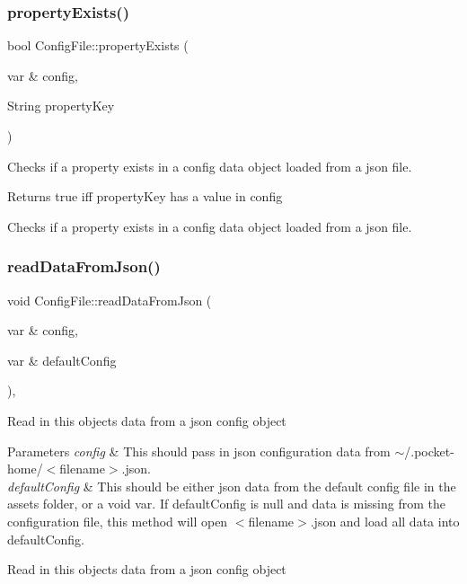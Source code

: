 \subsubsection{\texorpdfstring{property\+Exists()}{propertyExists()}}
{\footnotesize\ttfamily bool Config\+File\+::property\+Exists (\begin{DoxyParamCaption}\item[{var \&}]{config,  }\item[{String}]{property\+Key }\end{DoxyParamCaption})\hspace{0.3cm}{\ttfamily [protected]}}

Checks if a property exists in a config data object loaded from a json file.

\begin{DoxyReturn}{Returns}
true iff property\+Key has a value in config
\end{DoxyReturn}
Checks if a property exists in a config data object loaded from a json file. \mbox{\label{classConfigFile_af8d94d456b78720f3e90b6d9df3dc77e}} 
\subsubsection{\texorpdfstring{read\+Data\+From\+Json()}{readDataFromJson()}}
{\footnotesize\ttfamily void Config\+File\+::read\+Data\+From\+Json (\begin{DoxyParamCaption}\item[{var \&}]{config,  }\item[{var \&}]{default\+Config }\end{DoxyParamCaption})\hspace{0.3cm}{\ttfamily [protected]}, {\ttfamily [virtual]}}

Read in this object\textquotesingle{}s data from a json config object


\begin{DoxyParams}{Parameters}
{\em config} & This should pass in json configuration data from $\sim$/.pocket-\/home/$<$filename$>$.json.\\
\hline
{\em default\+Config} & This should be either json data from the default config file in the assets folder, or a void var. If default\+Config is null and data is missing from the configuration file, this method will open $<$filename$>$.json and load all data into default\+Config.\\
\hline
\end{DoxyParams}
Read in this object\textquotesingle{}s data from a json config object \mbox{\label{classConfigFile_abe813ce8975feb1bca7e06ce961df167}} 
